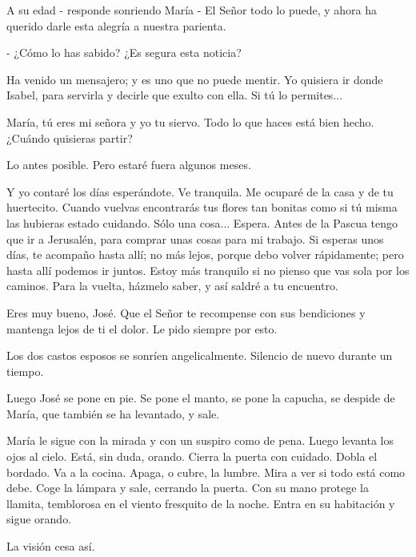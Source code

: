 \documentclass[12pt]{book} %
\begin{document}
A su edad - responde sonriendo María - El Señor todo lo puede, y ahora ha querido darle esta alegría a nuestra parienta. 

- ¿Cómo lo has sabido? ¿Es segura esta noticia? 

Ha venido un mensajero; y es uno que no puede mentir. Yo quisiera ir donde Isabel, para servirla y decirle que exulto con ella. Si tú lo permites... 

María, tú eres mi señora y yo tu siervo. Todo lo que haces está bien hecho. ¿Cuándo quisieras partir? 

Lo antes posible. Pero estaré fuera algunos meses. 

Y yo contaré los días esperándote. Ve tranquila. Me ocuparé de la casa y de tu huertecito. Cuando vuelvas encontrarás tus flores tan bonitas como si tú misma las hubieras estado cuidando. Sólo una cosa... Espera. Antes de la Pascua tengo que ir a Jerusalén, para comprar unas cosas para mi trabajo. Si esperas unos días, te acompaño hasta allí; no más lejos, porque debo volver rápidamente; pero hasta allí podemos ir juntos. Estoy más tranquilo si no pienso que vas sola por los caminos. Para la vuelta, házmelo saber, y así saldré a tu encuentro. 

Eres muy bueno, José. Que el Señor te recompense con sus bendiciones y mantenga lejos de ti el dolor. Le pido siempre por esto. 

Los dos castos esposos se sonríen angelicalmente. Silencio de nuevo durante un tiempo. 

Luego José se pone en pie. Se pone el manto, se pone la capucha, se despide de María, que también se ha levantado, y sale. 

María le sigue con la mirada y con un suspiro como de pena. Luego levanta los ojos al cielo. Está, sin duda, orando. Cierra la puerta con cuidado. Dobla el bordado. Va a la cocina. Apaga, o cubre, la lumbre. Mira a ver si todo está como debe. Coge la lámpara y sale, cerrando la puerta. Con su mano protege la llamita, temblorosa en el viento fresquito de la noche. Entra en su habitación y sigue orando. 

La visión cesa así. 
\end{document}
